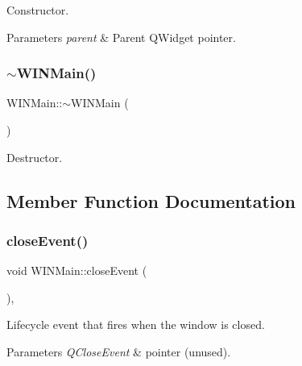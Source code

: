 Constructor. 


\begin{DoxyParams}{Parameters}
{\em parent} & Parent Q\+Widget pointer. \\
\hline
\end{DoxyParams}
\mbox{\label{class_w_i_n_main_a5e1564b7f926df4af04c224e8bb3bcb2}} 
\subsubsection{\texorpdfstring{$\sim$WINMain()}{~WINMain()}}
{\footnotesize\ttfamily W\+I\+N\+Main\+::$\sim$\+W\+I\+N\+Main (\begin{DoxyParamCaption}{ }\end{DoxyParamCaption})\hspace{0.3cm}{\ttfamily [override]}}



Destructor. 



\subsection{Member Function Documentation}
\mbox{\label{class_w_i_n_main_a84c2aceb5a5ccba0524894fdcc5c3348}} 
\subsubsection{\texorpdfstring{closeEvent()}{closeEvent()}}
{\footnotesize\ttfamily void W\+I\+N\+Main\+::close\+Event (\begin{DoxyParamCaption}\item[{Q\+Close\+Event $\ast$}]{ }\end{DoxyParamCaption})\hspace{0.3cm}{\ttfamily [override]}, {\ttfamily [protected]}}



Lifecycle event that fires when the window is closed. 


\begin{DoxyParams}{Parameters}
{\em Q\+Close\+Event} & pointer (unused). \\
\hline
\end{DoxyParams}
\mbox{\label{class_w_i_n_main_ac0613ca99ea81a68b7c188da371b136f}} 
